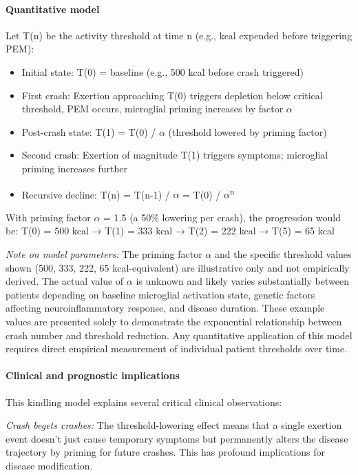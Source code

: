 \begin{hypothesis}
\paragraph{Quantitative model}

Let T(n) be the activity threshold at time n (e.g., kcal expended before triggering PEM):

\begin{itemize}
    \item Initial state: T(0) = baseline (e.g., 500 kcal before crash triggered)
    \item First crash: Exertion approaching T(0) triggers depletion below critical threshold, PEM occurs, microglial priming increases by factor $\alpha$
    \item Post-crash state: T(1) = T(0) / $\alpha$ (threshold lowered by priming factor)
    \item Second crash: Exertion of magnitude T(1) triggers symptoms; microglial priming increases further
    \item Recursive decline: T(n) = T(n-1) / $\alpha$ = T(0) / $\alpha$\textsuperscript{n}
\end{itemize}

With priming factor $\alpha$ = 1.5 (a 50\% lowering per crash), the progression would be:
T(0) = 500 kcal → T(1) = 333 kcal → T(2) = 222 kcal → T(5) = 65 kcal

\textit{Note on model parameters:} The priming factor $\alpha$ and the specific threshold values shown (500, 333, 222, 65 kcal-equivalent) are illustrative only and not empirically derived. The actual value of $\alpha$ is unknown and likely varies substantially between patients depending on baseline microglial activation state, genetic factors affecting neuroinflammatory response, and disease duration. These example values are presented solely to demonstrate the exponential relationship between crash number and threshold reduction. Any quantitative application of this model requires direct empirical measurement of individual patient thresholds over time.

\paragraph{Clinical and prognostic implications}

This kindling model explains several critical clinical observations:

\textit{Crash begets crashes:} The threshold-lowering effect means that a single exertion event doesn't just cause temporary symptoms but permanently alters the disease trajectory by priming for future crashes. This has profound implications for disease modification.


\end{hypothesis}
